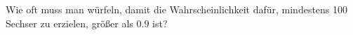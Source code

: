 \begin{exercise}
Wie oft muss man würfeln, damit die Wahrscheinlichkeit dafür, mindestens 100
Sechser zu erzielen, größer als 0.9 ist?
\end{exercise}
\begin{solution}
\end{solution}
